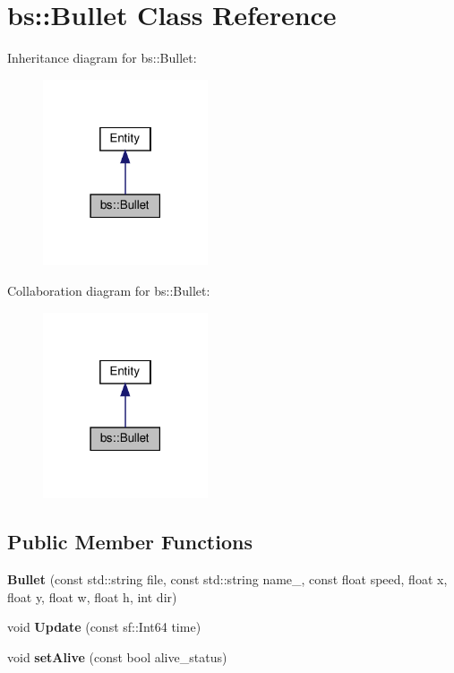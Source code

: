 \hypertarget{classbs_1_1_bullet}{}\section{bs\+:\+:Bullet Class Reference}
\label{classbs_1_1_bullet}


Inheritance diagram for bs\+:\+:Bullet\+:
\nopagebreak
\begin{figure}[H]
\begin{center}
\leavevmode
\includegraphics[width=138pt]{classbs_1_1_bullet__inherit__graph}
\end{center}
\end{figure}


Collaboration diagram for bs\+:\+:Bullet\+:
\nopagebreak
\begin{figure}[H]
\begin{center}
\leavevmode
\includegraphics[width=138pt]{classbs_1_1_bullet__coll__graph}
\end{center}
\end{figure}
\subsection*{Public Member Functions}
\begin{DoxyCompactItemize}
\item 
\mbox{\label{classbs_1_1_bullet_a43b9135e52be9c24e4ec6f61dbf3d23e}} 
{\bfseries Bullet} (const std\+::string file, const std\+::string name\+\_\+, const float speed, float x, float y, float w, float h, int dir)
\item 
\mbox{\label{classbs_1_1_bullet_afc39f37eb1ddd13a4603b427fd4a3acc}} 
void {\bfseries Update} (const sf\+::\+Int64 time)
\item 
\mbox{\label{classbs_1_1_bullet_a16b2fc78ea59225d00954a4ae6472f8f}} 
void {\bfseries set\+Alive} (const bool alive\+\_\+status)
\end{DoxyCompactItemize}
